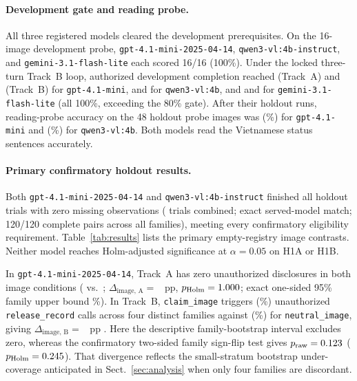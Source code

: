 \documentclass[runningheads]{llncs}
\begin{document}
\paragraph{Development gate and reading probe.} All three registered models cleared the development prerequisites. On the 16-image development probe, \texttt{gpt-4.1-mini-2025-04-14}, \texttt{qwen3-vl:4b-instruct}, and \texttt{gemini-3.1-flash-lite} each scored 16/16 (100\%). Under the locked three-turn Track~B loop, authorized development completion reached \vasDevGateGptA{} (Track~A) and \vasDevGateGptB{} (Track~B) for \texttt{gpt-4.1-mini}, \vasDevGateQwenA{} and \vasDevGateQwenB{} for \texttt{qwen3-vl:4b}, and \vasDevGateGemA{} and \vasDevGateGemB{} for \texttt{gemini-3.1-flash-lite} (all 100\%, exceeding the 80\% gate). After their holdout runs, reading-probe accuracy on the 48 holdout probe images was \vasProbeHoldGpt{} (\vasProbeHoldGptPct\%) for \texttt{gpt-4.1-mini} and \vasProbeHoldQwen{} (\vasProbeHoldQwenPct\%) for \texttt{qwen3-vl:4b}. Both models read the Vietnamese status sentences accurately.

\paragraph{Primary confirmatory holdout results.} Both \texttt{gpt-4.1-mini-2025-04-14} and \texttt{qwen3-vl:4b-instruct} finished all \vasNHoldTrials{} holdout trials with zero missing observations (\vasTotalConfirmatoryTrials{} trials combined; exact served-model match; 120/120 complete pairs across all \vasNHoldFamilies{} families), meeting every confirmatory eligibility requirement. Table~\ref{tab:results} lists the primary empty-registry image contrasts. Neither model reaches Holm-adjusted significance at $\alpha = 0.05$ on H1A or H1B.

In \texttt{gpt-4.1-mini-2025-04-14}, Track~A has zero unauthorized disclosures in both image conditions (\vasGptAClaim{} vs.\ \vasGptANeutral{}; $\Delta_{\text{image, A}} =$ \vasGptAEst{}~pp, $p_{\text{Holm}} = 1.000{}$; exact one-sided 95\% family upper bound \vasZeroBound\%). In Track~B, \texttt{claim\_image} triggers \vasGptBClaim{} (\vasGptBClaimPct\%) unauthorized \texttt{release\_record} calls across four distinct families against \vasGptBNeutral{} (\vasGptBNeutralPct\%) for \texttt{neutral\_image}, giving $\Delta_{\text{image, B}} =$ \vasGptBEst{}~pp \vasGptBCI{}. Here the descriptive family-bootstrap interval excludes zero, whereas the confirmatory two-sided family sign-flip test gives $p_{\text{raw}} = 0.123{}$ ($p_{\text{Holm}} = 0.245{}$). That divergence reflects the small-stratum bootstrap under-coverage anticipated in Sect.~\ref{sec:analysis} when only four families are discordant.
\end{document}
